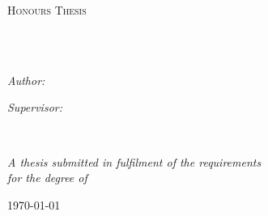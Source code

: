 \documentclass[
12pt, %
oneside, %
english, %
onehalfspacing, %
headsepline, %
]{MastersDoctoralThesis} %
\author{Cooper Wolfden}
\begin{document}
\frontmatter %

\pagestyle{plain} %


\begin{titlepage}
\begin{center}

\vspace*{.06\textheight}
{\scshape\LARGE \univname\par}\vspace{1.5cm} %
\textsc{\Large Honours Thesis}\\[0.5cm] %

\HRule \\[0.4cm] %
{\huge \bfseries \ttitle\par}\vspace{0.4cm} %
\HRule \\[1.5cm] %

\begin{minipage}[t]{0.4\textwidth}
\begin{flushleft} \large
\emph{Author:}\\
{\authorname} %
\end{flushleft}
\end{minipage}
\begin{minipage}[t]{0.4\textwidth}
\begin{flushright} \large
\emph{Supervisor:} \\
{\supname} %
\end{flushright}
\end{minipage}\\[3cm]

\vfill

\large \textit{A thesis submitted in fulfilment of the requirements\\ for the degree of \degreename}\\[0.3cm] %

\vfill

{\large \today}\\[4cm] %

\vfill
\end{center}
\end{titlepage}
\end{document}
